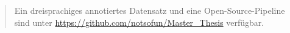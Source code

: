 \documentclass[../CLthesis.tex]{subfiles}
\begin{document}
\begin{abstract}
\begin{otherlanguage}{ngerman}
        Ein dreisprachiges annotiertes Datensatz und eine Open-Source-Pipeline sind unter \url{https://github.com/notsofun/Master_Thesis} verfügbar.

    \end{otherlanguage}

\end{abstract}

\newpage
\end{document}
